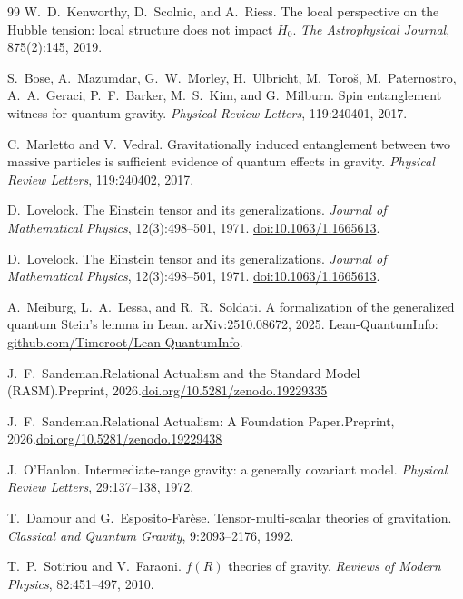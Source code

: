 \documentclass[11pt,a4paper]{article}
\theoremstyle{plain}
\theoremstyle{definition}
\theoremstyle{remark}
\begin{document}
\begin{thebibliography}{99}
W.~D.~Kenworthy, D.~Scolnic, and A.~Riess.
\newblock The local perspective on the {Hubble} tension: local structure does
  not impact $H_0$.
\newblock \textit{The Astrophysical Journal}, 875(2):145, 2019.

S.~Bose, A.~Mazumdar, G.~W.~Morley, H.~Ulbricht, M.~Toro\v{s},
  M.~Paternostro, A.~A.~Geraci, P.~F.~Barker, M.~S.~Kim, and G.~Milburn.
\newblock Spin entanglement witness for quantum gravity.
\newblock \textit{Physical Review Letters}, 119:240401, 2017.

C.~Marletto and V.~Vedral.
\newblock Gravitationally induced entanglement between two massive particles is
  sufficient evidence of quantum effects in gravity.
\newblock \textit{Physical Review Letters}, 119:240402, 2017.

D.~Lovelock.
\newblock The Einstein tensor and its generalizations.
\newblock \emph{Journal of Mathematical Physics}, 12(3):498--501, 1971.
\newblock \href{https://doi.org/10.1063/1.1665613}{doi:10.1063/1.1665613}.

D.~Lovelock.
\newblock The Einstein tensor and its generalizations.
\newblock \emph{Journal of Mathematical Physics}, 12(3):498--501, 1971.
\newblock \href{https://doi.org/10.1063/1.1665613}{doi:10.1063/1.1665613}.

A.~Meiburg, L.~A.~Lessa, and R.~R.~Soldati.
\newblock A formalization of the generalized quantum {Stein's} lemma in {Lean}.
\newblock arXiv:2510.08672, 2025.
\newblock Lean-QuantumInfo:
  \href{https://github.com/Timeroot/Lean-QuantumInfo}{github.com/Timeroot/Lean-QuantumInfo}.

J.~F.~Sandeman.\newblock Relational Actualism and the Standard Model ({RASM}).\newblock Preprint, 2026.\newblock \href{https://doi.org/10.5281/zenodo.19229335}{doi.org/10.5281/zenodo.19229335}

J.~F.~Sandeman.\newblock Relational Actualism: A Foundation Paper.\newblock Preprint, 2026.\newblock \href{https://doi.org/10.5281/zenodo.19229438}{doi.org/10.5281/zenodo.19229438}

J.~O'Hanlon.
\newblock Intermediate-range gravity: a generally covariant model.
\newblock \textit{Physical Review Letters}, 29:137--138, 1972.

T.~Damour and G.~Esposito-Far\`{e}se.
\newblock Tensor-multi-scalar theories of gravitation.
\newblock \textit{Classical and Quantum Gravity}, 9:2093--2176, 1992.

T.~P.~Sotiriou and V.~Faraoni.
\newblock $f(R)$ theories of gravity.
\newblock \textit{Reviews of Modern Physics}, 82:451--497, 2010.

\end{thebibliography}
\end{document}
